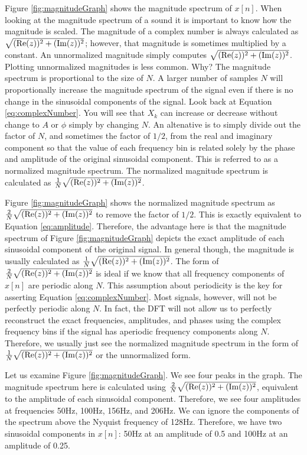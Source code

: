Figure \ref{fig:magnitudeGraph} shows the magnitude spectrum of $x[n]$.  When looking at the magnitude 
spectrum of a sound it is important to know how the magnitude is scaled.  The magnitude of a complex number
is always calculated as $\sqrt{(\mathrm{Re}{(z)})^2 + (\mathrm{Im}{(z)})^2}$; however, that magnitude is sometimes multiplied by
a constant.   An unnormalized magnitude simply computes $\sqrt{(\mathrm{Re}{(z)})^2 + (\mathrm{Im}{(z)})^2}$.  
Plotting unnormalized magnitudes is less common.  Why?  The magnitude spectrum is proportional to the size
of $N$.  A larger number of samples $N$ will proportionally increase the magnitude spectrum of the signal 
even if there is no change in the sinusoidal components of the signal.  Look back at Equation \ref{eq:complexNumber}.  You will see that $X_k$ can increase or decrease without change to $A$ or $\phi$
simply by changing $N$.  An altenative is to simply divide out the factor of $N$, and sometimes the factor of 
$1/2$, from the real and imaginary
component so that the value of each frequency bin is related solely by the phase and amplitude of the original
sinusoidal component.  This is referred to as a normalized magnitude spectrum.  The normalized
magnitude spectrum is calculated as $\frac{1}{N}\sqrt{(\mathrm{Re}{(z)})^2 + (\mathrm{Im}{(z)})^2}$.  

	Figure \ref{fig:magnitudeGraph} shows the normalized magnitude spectrum as 
$\frac{2}{N}\sqrt{(\mathrm{Re}{(z)})^2 + (\mathrm{Im}{(z)})^2}$ to remove the factor of $1/2$.  This is exactly equivalent to
Equation \ref{eq:amplitude}.  Therefore, the advantage here is that 
the magnitude spectrum of Figure \ref{fig:magnitudeGraph} depicts the exact amplitude of each sinusoidal
component of the original signal.  In general though, the magnitude is usually calculated as 
$\frac{1}{N}\sqrt{(\mathrm{Re}{(z)})^2 + (\mathrm{Im}{(z)})^2}$.  The form of $\frac{2}{N}\sqrt{(\mathrm{Re}{(z)})^2 + (\mathrm{Im}{(z)})^2}$ is
ideal if we know that all frequency components of $x[n]$ are periodic along $N$.  This assumption about
periodicity is the key for asserting Equation \ref{eq:complexNumber}.  Most signals, however, will not
be perfectly periodic along $N$.  In fact, the DFT will not allow us to perfectly reconstruct the exact frequencies,
amplitudes, and phases using the complex frequency bins if the signal has aperiodic frequency components
along $N$.  Therefore, we usually just see the normalized magnitude spectrum in the form of 
$\frac{1}{N}\sqrt{(\mathrm{Re}{(z)})^2 + (\mathrm{Im}{(z)})^2}$ or the unnormalized form.

Let us examine Figure \ref{fig:magnitudeGraph}.  We see four peaks in the graph.  The magnitude spectrum
here is calculated using $\frac{2}{N}\sqrt{(\mathrm{Re}{(z)})^2 + (\mathrm{Im}{(z)})^2}$, equivalent to the amplitude of each
sinusoidal component.  Therefore, we see four amplitudes at frequencies 50Hz, 100Hz, 156Hz, and 206Hz.  
We can ignore the components of the spectrum above the Nyquist frequency of 128Hz.  Therefore, we have two
sinusoidal components in $x[n]$: 50Hz at an amplitude of 0.5 and 100Hz at an amplitude of 0.25.  

